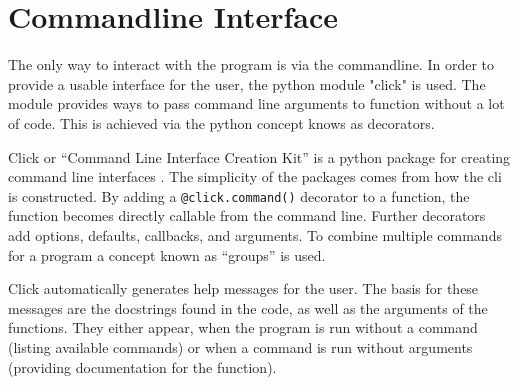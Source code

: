 \section{Commandline Interface}
The only way to interact with the program is via the commandline. In order to provide a usable interface for the user, the python module "click" is used. The module provides ways to pass command line arguments to function without a lot of code. This is achieved via the python concept knows as decorators.

Click or \enquote{Command Line Interface Creation Kit} is a python package for creating command line interfaces \cite{click}. The simplicity of the packages comes from how the cli is constructed. By adding a \lstinline{@click.command()} decorator to a function, the function becomes directly callable from the command line. Further decorators add options, defaults, callbacks, and arguments. To combine multiple commands for a program a concept known as \enquote{groups} is used.

Click automatically generates help messages for the user. The basis for these messages are the docstrings found in the code, as well as the arguments of the functions. They either appear, when the program is run without a command (listing available commands) or when a command is run without arguments (providing documentation for the function).
